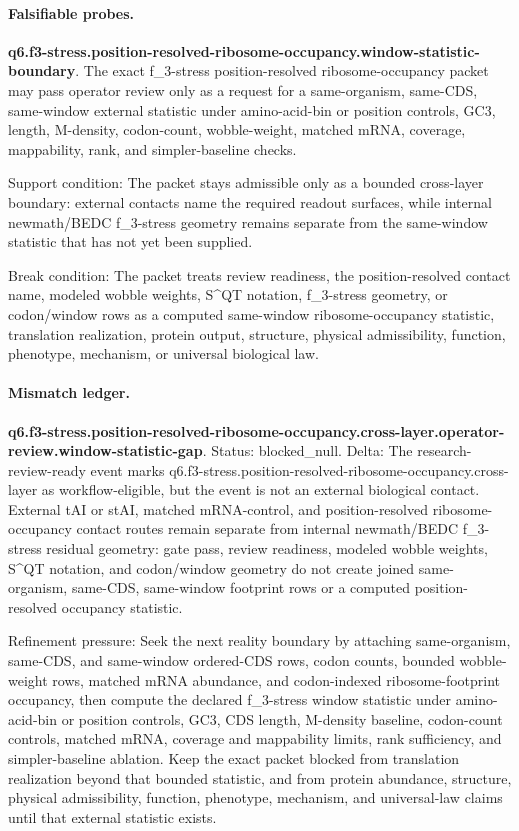 \paragraph{Falsifiable probes.}
\textbf{q6.f3-stress.position-resolved-ribosome-occupancy.window-statistic-boundary}. The exact f\_3-stress position-resolved ribosome-occupancy packet may pass operator review only as a request for a same-organism, same-CDS, same-window external statistic under amino-acid-bin or position controls, GC3, length, M-density, codon-count, wobble-weight, matched mRNA, coverage, mappability, rank, and simpler-baseline checks.

Support condition: The packet stays admissible only as a bounded cross-layer boundary: external contacts name the required readout surfaces, while internal newmath/BEDC f\_3-stress geometry remains separate from the same-window statistic that has not yet been supplied.

Break condition: The packet treats review readiness, the position-resolved contact name, modeled wobble weights, S\textasciicircum{}QT notation, f\_3-stress geometry, or codon/window rows as a computed same-window ribosome-occupancy statistic, translation realization, protein output, structure, physical admissibility, function, phenotype, mechanism, or universal biological law.

\paragraph{Mismatch ledger.}
\textbf{q6.f3-stress.position-resolved-ribosome-occupancy.cross-layer.operator-review.window-statistic-gap}. Status: blocked\_null. Delta: The research-review-ready event marks q6.f3-stress.position-resolved-ribosome-occupancy.cross-layer as workflow-eligible, but the event is not an external biological contact. External tAI or stAI, matched mRNA-control, and position-resolved ribosome-occupancy contact routes remain separate from internal newmath/BEDC f\_3-stress residual geometry: gate pass, review readiness, modeled wobble weights, S\textasciicircum{}QT notation, and codon/window geometry do not create joined same-organism, same-CDS, same-window footprint rows or a computed position-resolved occupancy statistic.

Refinement pressure: Seek the next reality boundary by attaching same-organism, same-CDS, and same-window ordered-CDS rows, codon counts, bounded wobble-weight rows, matched mRNA abundance, and codon-indexed ribosome-footprint occupancy, then compute the declared f\_3-stress window statistic under amino-acid-bin or position controls, GC3, CDS length, M-density baseline, codon-count controls, matched mRNA, coverage and mappability limits, rank sufficiency, and simpler-baseline ablation. Keep the exact packet blocked from translation realization beyond that bounded statistic, and from protein abundance, structure, physical admissibility, function, phenotype, mechanism, and universal-law claims until that external statistic exists.

